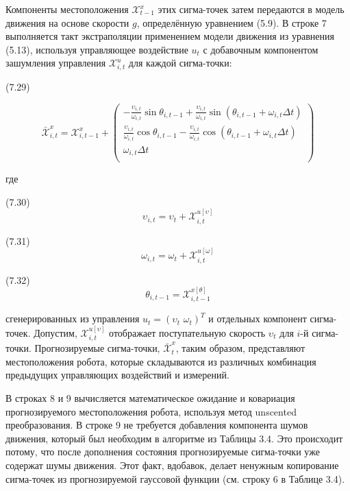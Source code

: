 \documentclass[10pt,a4paper]{article}
\begin{document}
Компоненты местоположения $\mathcal{X}_{t-1}^x$ этих сигма-точек затем передаются в модель движения на основе скорости $g$, определённую уравнением (5.9). В строке 7 выполняется такт экстраполяции применением модели движения из уравнения (5.13), используя управляющее воздействие $u_t$ с добавочным компонентом зашумления управления $\mathcal{X}_{i,t}^u$ для каждой сигма-точки:

(7.29)
\begin{minipage}{0.2\textwidth}\begin{equation*}
\bar{\mathcal{X}}_{i,t}^x=\mathcal{X}_{i,t-1}^x+
\left(\begin{array}{c}
-\frac{\upsilon_{i,t}}{\omega_{i,t}}\sin\theta_{i,t-1}+\frac{\upsilon_{i,t}}{\omega_{i,t}}\sin(\theta_{i,t-1}+\omega_{i,t}\varDelta t)\\
\frac{\upsilon_{i,t}}{\omega_{i,t}}\cos\theta_{i,t-1}-\frac{\upsilon_{i,t}}{\omega_{i,t}}\cos(\theta_{i,t-1}+\omega_{i,t}\varDelta t)\\
\omega_{i,t}\varDelta t\\
\end{array}\right)
\end{equation*}
\end{minipage}

где

(7.30)
$$\upsilon_{i,t}=\upsilon_t+\mathcal{X}_{i,t}^{u[\upsilon]}$$

(7.31)
$$\omega_{i,t}=\omega_t+\mathcal{X}_{i,t}^{u[\omega]}$$

(7.32)
$$\theta_{i,t-1}=\mathcal{X}_{i,t-1}^{x[\theta]}$$

сгенерированных из управления $u_t = (\upsilon_t\,\, \omega_t)^T$ и отдельных компонент сигма-точек. Допустим, $\mathcal{X}_{i,t}^{u[\upsilon]}$ отображает поступательную скорость $\upsilon_t$ для $i$-й сигма-точки. Прогнозируемые сигма-точки, $\bar{\mathcal{X}}_t^x$, таким образом, представляют местоположения робота, которые складываются из различных комбинация предыдущих управляющих воздействий и измерений. 

В строках 8 и 9 вычисляется математическое ожидание и ковариация прогнозируемого местоположения робота, используя метод unscented преобразования. В строке 9 не требуется добавления компонента шумов движения, который был необходим в алгоритме из Таблицы 3.4. Это происходит потому, что после дополнения состояния прогнозируемые сигма-точки уже содержат шумы движения. Этот факт, вдобавок, делает ненужным копирование сигма-точек из прогнозируемой гауссовой функции (см. строку 6 в Таблице 3.4).
\end{document}
